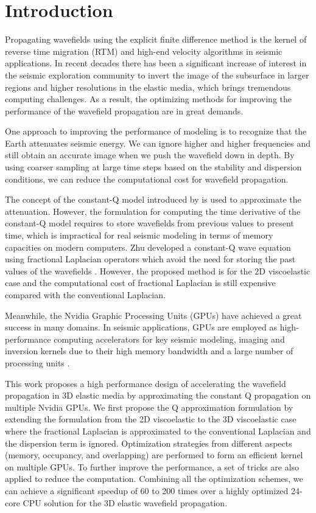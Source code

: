 \documentclass{paris17}
\begin{document}
\section{Introduction}

Propagating wavefields using the explicit finite difference method is the kernel of reverse time migration (RTM) and high-end velocity algorithms in seismic applications. In recent decades there has been a significant increase of interest in the seismic exploration community to invert the image of the subsurface in larger regions and higher resolutions in the elastic media, which brings tremendous computing challenges. As a result, the optimizing methods for improving the performance of the wavefield propagation are in great demands.

One approach to improving the performance of modeling is to recognize that the Earth attenuates seismic energy. We can ignore higher and higher frequencies and still obtain an accurate image\cite[]{Clapp.sep.111.bob3} when we push the wavefield down in depth. By using coarser sampling at large time steps based on the stability and dispersion conditions, we can reduce the computational cost for wavefield propagation. 

The concept of the constant-Q model introduced by \cite{Kjartansson.sep.23} is used to approximate the attenuation. However, the formulation for computing the time derivative of the constant-Q model requires to store wavefields from previous values to present time, which is impractical for real seismic modeling in terms of memory capacities on modern computers. Zhu developed a constant-Q wave equation using fractional Laplacian operators which avoid the need for storing the past values of the wavefields \cite[]{zhu2014theory,shen2013wave}. However, the proposed method is for the 2D viscoelastic case and the computational cost of fractional Laplacian is still expensive compared with the conventional Laplacian.

Meanwhile, the Nvidia Graphic Processing Units (GPUs)  have achieved a great success in many domains. In seismic applications, GPUs are employed as high-performance computing accelerators for key seismic modeling, imaging and inversion kernels due to their high memory bandwidth and a large number of processing units \cite[]{he2015gpu}.

This work proposes a high performance design of accelerating the wavefield propagation in 3D elastic media by approximating the constant Q propagation on multiple Nvidia GPUs. We first propose the Q approximation formulation by extending the formulation from the 2D viscoelastic to the 3D viscoelastic case where the fractional Laplacian is approximated to the conventional Laplacian and the dispersion term is ignored.  Optimization strategies from different aspects (memory, occupancy, and overlapping) are performed to form an efficient kernel on multiple GPUs. To further improve the performance, a set of tricks are also applied to reduce the computation. Combining all the optimization schemes, we can achieve a significant speedup of 60 to 200 times over a highly optimized 24-core CPU solution for the 3D elastic wavefield propagation.
\end{document}
